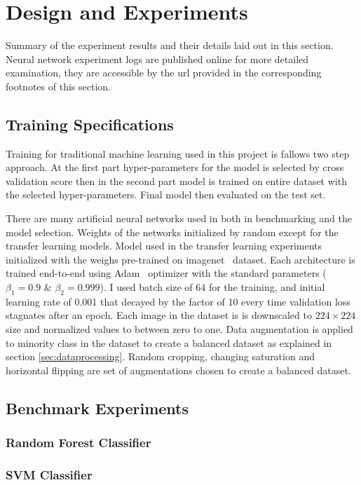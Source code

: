\chapter{Design and Experiments}
Summary of the experiment results and their details laid out in this section.
Neural network experiment logs are published online for more detailed examination, they are accessible by the url provided in the corresponding footnotes of this section.

\section{Training Specifications}
Training for traditional machine learning used in this project is fallows two step approach.
At the first part hyper-parameters for the model is selected by cross validation score then in the second part model is trained on entire dataset with the selected hyper-parameters.
Final model then evaluated on the test set.

There are many artificial neural networks used in both in benchmarking and the model selection.
Weights of the networks initialized by random except for the transfer learning models.
Model used in the transfer learning experiments initialized with the weighs pre-trained on imagenet~\cite{imagenet} dataset.
Each architecture is trained end-to-end using Adam~\cite{adam} optimizer with the standard parameters ($\beta_1 = 0.9$ \& $\beta_2 = 0.999$).
I used batch size of 64 for the training, and initial learning rate of 0.001 that decayed by the factor of 10 every time validation loss stagnates after an epoch.
Each image in the dataset is is downscaled to $224 \times 224$ size and normalized values to between zero to one.
Data augmentation is applied to minority class in the dataset to create a balanced dataset as explained in section \ref{sec:dataprocessing}.
Random cropping, changing saturation and horizontal flipping are set of augmentations chosen to create a balanced dataset.


\section{Benchmark Experiments}

\subsection{Random Forest Classifier}
\subsection{SVM Classifier}
